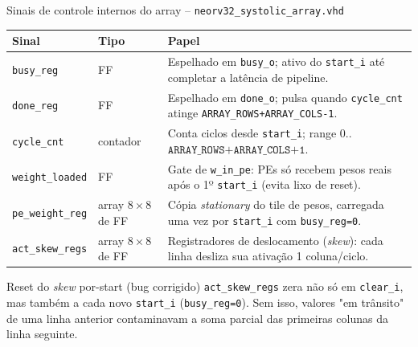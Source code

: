 \documentclass[aspectratio=169,10pt]{beamer}
\begin{document}
\begin{frame}{Sinais de controle internos do array -- \texttt{neorv32\_systolic\_array.vhd}}
  \small
  \begin{tabularx}{\linewidth}{llX}
    \toprule
    \textbf{Sinal} & \textbf{Tipo} & \textbf{Papel} \\
    \midrule
    \texttt{busy\_reg} & FF & Espelhado em \texttt{busy\_o}; ativo do \texttt{start\_i} até completar a latência de pipeline. \\
    \texttt{done\_reg} & FF & Espelhado em \texttt{done\_o}; pulsa quando \texttt{cycle\_cnt} atinge \texttt{ARRAY\_ROWS+ARRAY\_COLS-1}. \\
    \texttt{cycle\_cnt} & contador & Conta ciclos desde \texttt{start\_i}; range $0$..$\texttt{ARRAY\_ROWS+ARRAY\_COLS+1}$. \\
    \texttt{weight\_loaded} & FF & Gate de \texttt{w\_in\_pe}: PEs só recebem pesos reais após o 1º \texttt{start\_i} (evita lixo de reset). \\
    \texttt{pe\_weight\_reg} & array $8{\times}8$ de FF & Cópia \emph{stationary} do tile de pesos, carregada uma vez por \texttt{start\_i} com \texttt{busy\_reg=0}. \\
    \texttt{act\_skew\_regs} & array $8{\times}8$ de FF & Registradores de deslocamento (\emph{skew}): cada linha desliza sua ativação 1 coluna/ciclo. \\
    \bottomrule
  \end{tabularx}

  \vspace{1em}
  \begin{alertblock}{Reset do \emph{skew} por-start (bug corrigido)}
    \texttt{act\_skew\_regs} zera não só em \texttt{clear\_i}, mas também a
    cada novo \texttt{start\_i} (\texttt{busy\_reg=0}). Sem isso, valores
    "em trânsito" de uma linha anterior contaminavam a soma parcial das
    primeiras colunas da linha seguinte.
  \end{alertblock}
\end{frame}
\end{document}
